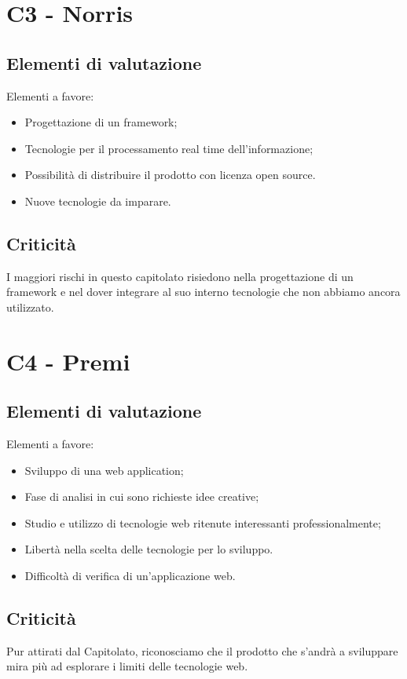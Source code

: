 \section{C3 - Norris}{
	\subsection{Elementi di valutazione}{
		Elementi a favore:
		\begin{itemize}
			\item Progettazione di un framework;
			\item Tecnologie per il processamento real time dell'informazione;
			\item Possibilità di distribuire il prodotto con licenza open source.
		\end{itemize}
		
		\begin{itemize}
			\item Nuove tecnologie da imparare.
		\end{itemize}
	}
	\subsection{Criticità}{
		I maggiori rischi in questo capitolato risiedono nella progettazione di un framework e nel dover integrare al suo interno tecnologie che non abbiamo ancora utilizzato.
	}
}
\section{C4 - Premi}{
	\subsection{Elementi di valutazione}{
		Elementi a favore:
		\begin{itemize}
			\item Sviluppo di una web application;
			\item Fase di analisi in cui sono richieste idee creative;
			\item Studio e utilizzo di tecnologie web ritenute interessanti professionalmente;
			\item Libertà nella scelta delle tecnologie per lo sviluppo.
		\end{itemize}
		
		\begin{itemize}
			\item Difficoltà di verifica di un'applicazione web.
		\end{itemize}
	}
	\subsection{Criticità}{
		Pur attirati dal Capitolato, riconosciamo che il prodotto che s'andrà a sviluppare mira più ad esplorare i limiti delle tecnologie web.
	}
}
